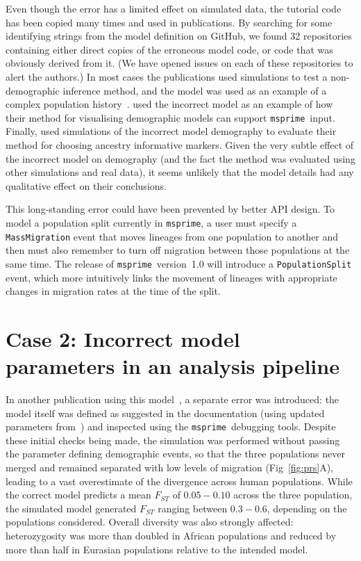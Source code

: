 \documentclass{article}
\newcommand{\msprime}[0]{\texttt{msprime}}
\begin{document}
Even though the error has a limited effect on simulated data, the tutorial code has been
copied many times and used in publications. By searching for some identifying strings
from the model definition on GitHub,
we found 32 repositories containing either direct copies of the
erroneous model code, or code that was obviously derived from it.
(We have opened issues on each of these repositories to alert the authors.)
In most cases the publications used simulations to test a non-demographic inference
method, and the model was used as an example of a complex population
history~\citep{kelleher2019inferring,albers2020dating,tong2020population}.
\cite{zhou2018popdemog} used the incorrect model as an example
of how their method for visualising demographic models can support
\msprime\ input.
Finally, \cite{pfaffelhuber2020choose}
used simulations of the incorrect model demography to evaluate
their method for choosing ancestry informative markers.
Given the very subtle effect of the incorrect
model on demography (and the fact the method was evaluated using other
simulations and real data), it seems unlikely that the model details
had any qualitative effect on their conclusions.

This long-standing error could have been prevented by better API design.
To model a population split currently in \msprime, a user must specify a
\texttt{MassMigration} event that moves lineages from one population to another
and then must also remember to turn off migration
between those populations at the same time.
The release of \msprime\ version~1.0 will introduce a \texttt{PopulationSplit} event,
which more intuitively links the movement of lineages with appropriate changes in
migration rates at the time of the split.

\section*{Case 2: Incorrect model parameters in an analysis pipeline}

In another publication using this model~\citep{martin2017human},
a separate error was introduced: the model itself was defined as suggested
in the documentation (using updated parameters
from~\citet{gravel2011demographic}) and inspected
using the \msprime\ debugging tools.
Despite these initial checks being made, the simulation
was performed without passing the parameter defining demographic events,
so that the three populations
never merged and remained separated with low levels of migration (Fig~\ref{fig:prs}A),
leading to a vast overestimate of the divergence across human populations.
While the correct model predicts a mean $F_{ST}$ of
$0.05 - 0.10$ across the three population, the simulated model generated $F_{ST}$
ranging between $0.3 - 0.6$, depending on the populations considered.
Overall diversity was also strongly affected: heterozygosity was more than
doubled in African populations and reduced by more than half in Eurasian populations
relative to the intended model.
\end{document}
